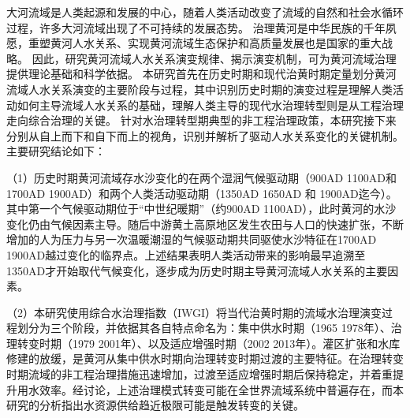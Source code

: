 \begin{cabstract}



大河流域是人类起源和发展的中心，随着人类活动改变了流域的自然和社会水循环过程，许多大河流域出现了不可持续的发展态势。
治理黄河是中华民族的千年夙愿，重塑黄河人\textendash{}水关系、实现黄河流域生态保护和高质量发展也是国家的重大战略。
因此，研究黄河流域人\textendash{}水关系演变规律、揭示演变机制，可为黄河流域治理提供理论基础和科学依据。
本研究首先在历史时期和现代治黄时期定量划分黄河流域人\textendash{}水关系演变的主要阶段与过程，其中识别历史时期的演变过程是理解人类活动如何主导流域人\textendash{}水关系的基础，理解人类主导的现代水治理转型则是从工程治理走向综合治理的关键。
针对水治理转型期典型的非工程治理政策，本研究接下来分别从自上而下和自下而上的视角，识别并解析了驱动人\textendash{}水关系变化的关键机制。主要研究结论如下：

（1）历史时期黄河流域存水沙变化的在两个湿润气候驱动期（900AD \textendash{} 1100AD和1700AD \textendash{} 1900AD）和两个人类活动驱动期（1350AD \textendash{} 1650AD 和 1900AD迄今）。其中第一个气候驱动期位于“中世纪暖期”（约900AD \textendash{} 1100AD），此时黄河的水沙变化仍由气候因素主导。随后中游黄土高原地区发生农田与人口的快速扩张，不断增加的人为压力与另一次温暖潮湿的气候驱动期共同驱使水沙特征在1700AD \textendash{} 1900AD越过变化的临界点。上述结果表明人类活动带来的影响最早追溯至1350AD才开始取代气候变化，逐步成为历史时期主导黄河流域人\textendash{}水关系的主要因素。

（2）本研究使用综合水治理指数（IWGI）将当代治黄时期的流域水治理演变过程划分为三个阶段，并依据其各自特点命名为：集中供水时期（1965 \textendash{} 1978年）、治理转变时期（1979 \textendash{} 2001年）、以及适应增强时期（2002 \textendash{} 2013年）。灌区扩张和水库修建的放缓，是黄河从集中供水时期向治理转变时期过渡的主要特征。在治理转变时期流域的非工程治理措施迅速增加，过渡至适应增强时期后保持稳定，并着重提升用水效率。经讨论，上述治理模式转变可能在全世界流域系统中普遍存在，而本研究的分析指出水资源供给趋近极限可能是触发转变的关键。


\end{cabstract}
